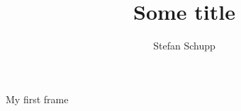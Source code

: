 \documentclass[]{beamer}
\title{Some title}
\author[Stefan Schupp]{Stefan Schupp}
\begin{document}
\begin{frame}{My first frame}
    
\end{frame}
\end{document}
